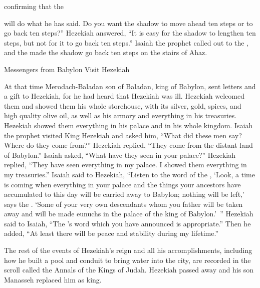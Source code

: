 {{}
confirming that
the

{}
will do
what
he has
said.
Do you want the shadow
to move ahead
ten
steps
or
to go back
ten
steps?”
Hezekiah
answered,
“It is easy
for the shadow
to lengthen
ten
steps,
but not
for
it
to go
back
ten
steps.”
Isaiah
the prophet
called out
to
the {}, and the
{} made
the shadow
go
back
ten
steps
on the stairs
of Ahaz.
\par }{\SH Messengers from Babylon Visit Hezekiah
\par }{\PP {}At that time
Merodach-Baladan
son
of Baladan,
king
of Babylon,
sent letters
and a gift
to
Hezekiah,
for
he had heard
that
Hezekiah
was ill.
Hezekiah
welcomed
them and
showed
them his whole
storehouse,
with its
silver,
gold,
spices,
and
high quality olive oil,
as
well
as his armory
and everything
in his treasuries.
Hezekiah
showed
them everything
in his palace
and in his whole
kingdom.
Isaiah
the prophet
visited
King
Hezekiah
and asked
him, “What
did these
men
say? Where
do they come
from?” Hezekiah
replied,
“They come
from the distant
land
of Babylon.”
Isaiah asked,
“What
have they seen
in your palace?” Hezekiah
replied,
“They have
seen
everything
in my palace.
I showed
them everything
in my treasuries.”
Isaiah
said
to
Hezekiah,
“Listen
to the word
of the {},
‘Look,
a time
is coming
when everything
in your palace
and the things your ancestors
have accumulated
to this
day
will be carried
away to Babylon;
nothing
will be left,’
says
the {}.
‘Some
of your very own descendants
whom
you father
will be taken
away and will be
made eunuchs
in the palace
of the king
of Babylon.’ ”
Hezekiah
said
to
Isaiah,
“The
{}’s
word
which
you have announced
is appropriate.”
Then he added, “At least
there will be peace
and stability
during my lifetime.”
\par }{\PP {}The rest
of the events
of Hezekiah’s
reign and all
his accomplishments,
including how he built
a pool
and conduit
to bring
water
into the city,
are recorded
in
the scroll
called the Annals
of the Kings
of Judah.
Hezekiah
passed away
and his son
Manasseh
replaced
him as king.

}
